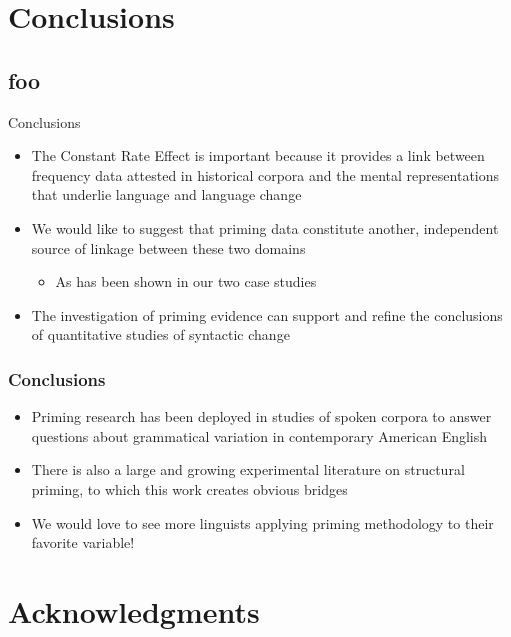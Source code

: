 \documentclass{digs-slides}
\begin{document}
\section{Conclusions}
\label{sec:conclusion}

\subsection*{foo}

\begin{frame}{Conclusions}
    \begin{itemize}
      \item The Constant Rate Effect is important because it
        provides a link between frequency data attested in historical
        corpora and the mental representations that underlie language
        and language change
      \item We would like to suggest that priming data constitute
        another, independent source of linkage between these two domains
        \begin{itemize}
          \item As has been shown in our two case studies
        \end{itemize}
      \item The investigation of priming evidence can support and refine
        the conclusions of quantitative studies of syntactic change
    \end{itemize}
\end{frame}

\begin{frame}
    \frametitle{Conclusions}
    \begin{itemize}
      \item Priming research has been deployed in studies of spoken
        corpora to answer questions about grammatical variation in
        contemporary American English
      \item There is also a large and growing experimental literature on
        structural priming, to which this work creates obvious bridges
      \item We would love to see more linguists applying priming
        methodology to their favorite variable!
    \end{itemize}
\end{frame}

\appendix{}

\section{Acknowledgments}
\end{document}

